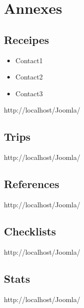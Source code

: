 \documentclass[8pt]{article} %
\begin{document}
\section{Annexes}

\subsection{Receipes}
\begin{itemize}
  \item Contact1 
  \item Contact2 
  \item Contact3 
\end{itemize}
http://localhost/Joomla/
\subsection{Trips}
http://localhost/Joomla/
\subsection{References}
http://localhost/Joomla/
\subsection{Checklists}			
http://localhost/Joomla/
\subsection{Stats}
http://localhost/Joomla/
\end{document}
